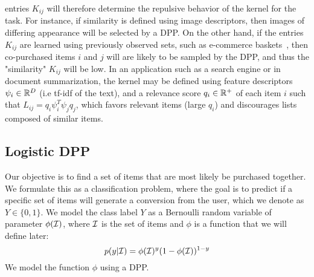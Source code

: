 entries $K_{ij}$ will therefore determine the repulsive behavior of the kernel
for the task. For instance, if similarity is defined using image descriptors,
then images of differing appearance will be selected by a DPP. On the other
hand, if the entries $K_{ij}$ are learned using previously observed sets, such as
e-commerce baskets~\cite{DBLP:conf/aaai/GartrellPK17}, then co-purchased items $i$ and
$j$ will are likely to be sampled by the DPP, and thus the "similarity" $K_{ij}$
will be low. In an application such as a search engine or in document summarization, the
kernel may be defined using feature descriptors $\psi_i \in \mathbb{R}^D$ (i.e tf-idf
of the text), and a relevance score $q_i \in \mathbb{R}^+$ of each item $i$ such that
$L_{ij} = q_i \psi_i^T \psi_j q_j$, which favors relevant items (large $q_i$) and
discourages lists composed of similar items. 

\subsection{Logistic DPP}
Our objective is to find a set of items that are most likely be purchased
together. We formulate this as a classification problem, where the goal is to
predict if a specific set of items will generate a conversion from the user,
which we denote as $Y \in \{0,1\}$. We model the class label $Y$ as a Bernoulli random
variable of parameter $\phi(\mathcal{I})$, where $\mathcal{I}$ is the set of items and $\phi$
is a function that we will define later:
\begin{equation}
p(y|\mathcal{I}) = \phi(\mathcal{I})^y(1-\phi(\mathcal{I}))^{1-y}
\end{equation} 
We model the function $\phi$ using a DPP. 

